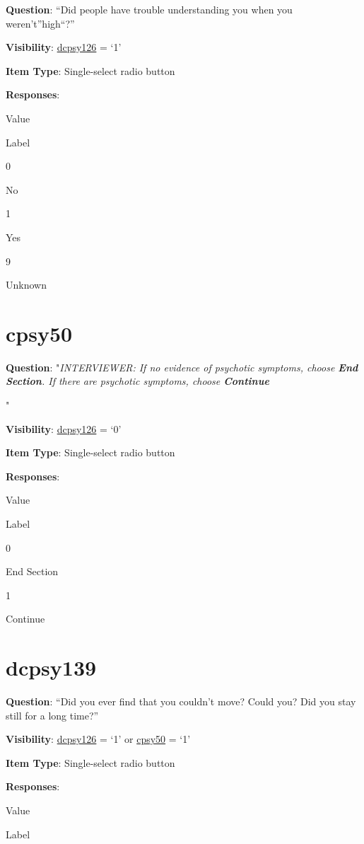 \documentclass[]{book}
\begin{document}
\textbf{Question}: ``Did people have trouble understanding you when you weren't''high``?''

\textbf{Visibility}: \protect\hyperlink{dcpsy126}{dcpsy126} = `1'

\textbf{Item Type}: Single-select radio button

\textbf{Responses}:

Value

Label

0

No

1

Yes

9

Unknown

\hypertarget{cpsy50}{%
\section{cpsy50}\label{cpsy50}}

\textbf{Question}: "\emph{INTERVIEWER: If no evidence of psychotic symptoms, choose \textbf{End Section}. If there are psychotic symptoms, choose \textbf{Continue}}

"

\textbf{Visibility}: \protect\hyperlink{dcpsy126}{dcpsy126} = `0'

\textbf{Item Type}: Single-select radio button

\textbf{Responses}:

Value

Label

0

End Section

1

Continue

\hypertarget{dcpsy139}{%
\section{dcpsy139}\label{dcpsy139}}

\textbf{Question}: ``Did you ever find that you couldn't move? Could you? Did you stay still for a long time?''

\textbf{Visibility}: \protect\hyperlink{dcpsy126}{dcpsy126} = `1' or \protect\hyperlink{cpsy50}{cpsy50} = `1'

\textbf{Item Type}: Single-select radio button

\textbf{Responses}:

Value

Label
\end{document}

